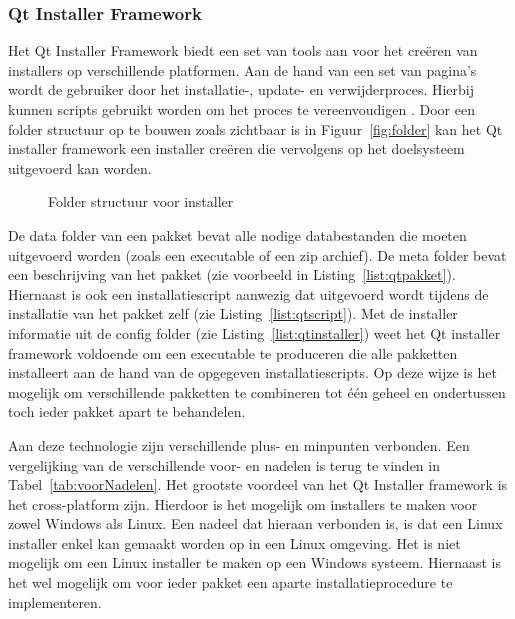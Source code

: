 \subsubsection{Qt Installer Framework}
Het Qt Installer Framework biedt een set van tools aan voor het creëren van installers op verschillende platformen.
Aan de hand van een set van pagina's wordt de gebruiker door het installatie-, update- en verwijderproces.
Hierbij kunnen scripts gebruikt worden om het proces te vereenvoudigen \citep{qtDoc}.
Door een folder structuur op te bouwen zoals zichtbaar is in Figuur~\vref{fig:folder} kan het Qt installer framework een installer creëren die vervolgens op het doelsysteem uitgevoerd kan worden.

\begin{figure}[!ht]
\centering
{}
\caption{Folder structuur voor installer}
\label{fig:folder}
\end{figure}

De data folder van een pakket bevat alle nodige databestanden die moeten uitgevoerd worden (zoals een executable of een zip archief).
De meta folder bevat een beschrijving van het pakket (zie voorbeeld in Listing~\vref{list:qtpakket}).
Hiernaast is ook een installatiescript aanwezig dat uitgevoerd wordt tijdens de installatie van het pakket zelf (zie Listing~\vref{list:qtscript}).
Met de installer informatie uit de config folder (zie Listing~\vref{list:qtinstaller}) weet het Qt installer framework voldoende om een executable te produceren die alle pakketten installeert aan de hand van de opgegeven installatiescripts.
Op deze wijze is het mogelijk om verschillende pakketten te combineren tot één geheel en ondertussen toch ieder pakket apart te behandelen.

Aan deze technologie zijn verschillende plus- en minpunten verbonden.
Een vergelijking van de verschillende voor- en nadelen is terug te vinden in Tabel~\ref{tab:voorNadelen}.
Het grootste voordeel van het Qt Installer framework is het cross-platform zijn.
Hierdoor is het mogelijk om installers te maken voor zowel Windows als Linux.
Een nadeel dat hieraan verbonden is, is dat een Linux installer enkel kan gemaakt worden op in een Linux omgeving.
Het is niet mogelijk om een Linux installer te maken op een Windows systeem.
Hiernaast is het wel mogelijk om voor ieder pakket een aparte installatieprocedure te implementeren.



